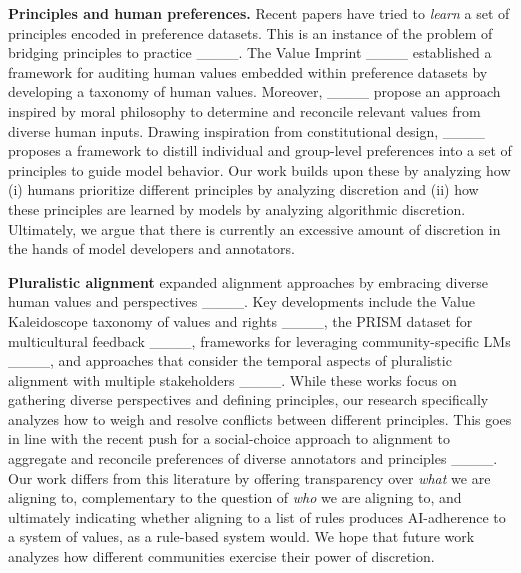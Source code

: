 \noindent \textbf{Principles and human preferences.} Recent papers have tried to \textit{learn} a set of principles encoded in preference datasets. This is an instance of the problem of bridging principles to practice ____. The Value Imprint ____ established a framework for auditing human values embedded within preference datasets by developing a taxonomy of human values. Moreover, ____ propose an approach inspired by moral philosophy to determine and reconcile relevant values from diverse human inputs.  Drawing inspiration from constitutional design, ____ proposes a framework to distill individual and group-level preferences into a set of principles to guide model behavior. Our work builds upon these by analyzing how (i) humans prioritize different principles by analyzing discretion and (ii) how these principles are learned by models by analyzing algorithmic discretion.
Ultimately, we argue that there is currently an excessive amount of discretion in the hands of model developers and annotators.


\noindent \textbf{Pluralistic alignment} expanded alignment approaches by embracing diverse human values and perspectives ____. Key developments include the Value Kaleidoscope taxonomy of values and rights ____, the PRISM dataset for multicultural feedback ____, frameworks for leveraging community-specific LMs ____, and approaches that consider the temporal aspects of pluralistic alignment with multiple stakeholders ____. While these works focus on gathering diverse perspectives and defining principles, our research specifically analyzes how to weigh and resolve conflicts between different principles. This goes in line with the recent push for a social-choice approach to alignment to aggregate and reconcile preferences of diverse annotators and principles ____.
Our work differs from this literature by offering transparency over \textit{what} we are aligning to, complementary to the question of \textit{who} we are aligning to, and ultimately indicating whether aligning to a list of rules produces AI-adherence to a system of values, as a rule-based system would. We hope that future work analyzes how different communities exercise their power of discretion.

